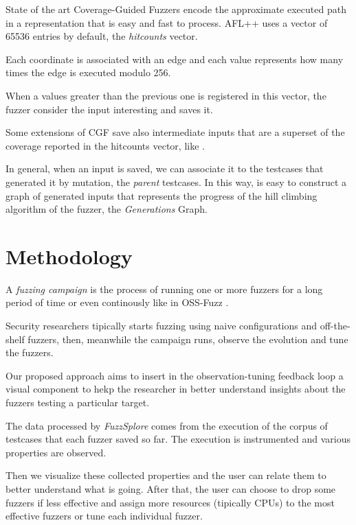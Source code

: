\documentclass[conference,compsoc]{IEEEtran}
\begin{document}
State of the art Coverage-Guided Fuzzers encode the approximate executed path in a representation that is easy and fast to process.
{\sc AFL++} uses a vector of 65536 entries by default, the {\it hitcounts} vector.

Each coordinate is associated with an edge and each value represents how many times the edge is executed modulo 256.

When a values greater than the previous one is registered in this vector, the fuzzer consider the input interesting and saves it.

Some extensions of CGF save also intermediate inputs that are a superset of the coverage reported in the hitcounts vector, like \cite{lafintel} \cite{ijon} \cite{besensitive}.

In general, when an input is saved, we can associate it to the testcases that generated it by mutation, the {\it parent} testcases. In this way, is easy to construct a graph of generated inputs that represents the progress of the hill climbing algorithm of the fuzzer, the {\it Generations} Graph.


\section{Methodology}

A {\em fuzzing campaign} is the process of running one or more fuzzers for a long period of time or even continously like in OSS-Fuzz \cite{serebryany2017oss}.

Security researchers tipically starts fuzzing using naive configurations and off-the-shelf fuzzers, then, meanwhile the campaign runs, observe the evolution and tune the fuzzers.

Our proposed approach aims to insert in the observation-tuning feedback loop a visual component to hekp the researcher in better understand insights about the fuzzers testing a particular target.

The data processed by {\em FuzzSplore} comes from the execution of the corpus of testcases that each fuzzer saved so far. The execution is instrumented and various properties are observed.

Then we visualize these collected properties and the user can relate them to better understand what is going. After that, the user can choose to drop some fuzzers if less effective and assign more resources (tipically CPUs) to the most effective fuzzers or tune each individual fuzzer.
\end{document}
